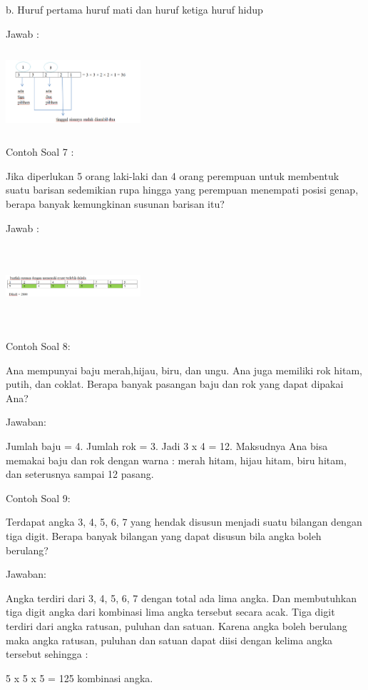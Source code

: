 \documentclass[11pt,fleqn]{book} %
\begin{document}
b.      Huruf pertama huruf mati dan huruf ketiga huruf hidup

Jawab :

\includegraphics[width = 5cm, height=3cm]{Pictures/soalkaidah2.png}

Contoh Soal 7 :

Jika diperlukan 5 orang laki-laki dan 4 orang perempuan untuk membentuk suatu barisan sedemikian rupa hingga yang perempuan menempati posisi genap, berapa banyak kemungkinan susunan barisan itu?

Jawab :

\includegraphics[width = 5cm, height=3cm]{Pictures/soalkaidah3.png}

Contoh Soal 8:

Ana mempunyai baju merah,hijau, biru, dan ungu. Ana juga memiliki rok hitam, putih, dan coklat. Berapa banyak pasangan baju dan rok yang dapat dipakai Ana?

Jawaban:

Jumlah baju = 4. 
Jumlah rok = 3.
 Jadi 3 x 4 = 12.
 Maksudnya Ana bisa memakai baju dan rok dengan warna : 
merah hitam, hijau hitam, biru hitam, dan seterusnya sampai 12 pasang.

Contoh Soal 9: 

Terdapat angka 3, 4, 5, 6, 7 yang hendak disusun menjadi suatu bilangan dengan tiga digit. 
Berapa banyak bilangan yang dapat disusun bila angka boleh berulang?

Jawaban:

Angka terdiri dari 3, 4, 5, 6, 7 dengan total ada lima angka. Dan membutuhkan tiga digit angka dari kombinasi lima angka tersebut secara acak. Tiga digit terdiri dari angka ratusan, puluhan dan satuan. Karena angka boleh berulang maka angka ratusan, puluhan dan satuan dapat diisi dengan kelima angka tersebut sehingga :

 5 x 5 x 5 = 125 kombinasi angka.
 
\end{document}
